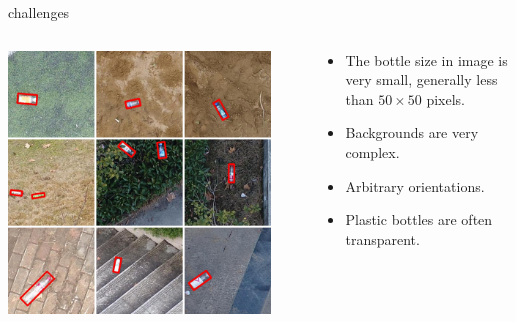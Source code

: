 \documentclass[newPxFont, fullfooter, sectionpages, progressbar, displaynote]{beamer}
\begin{document}
\begin{frame}[c]{challenges}
	\only<3->
	{
		\begin{columns}
			\begin{column}{0.4\linewidth}
				\centering
				\includegraphics[width=0.9\textwidth]{images/bottle_UAV.png}
			\end{column}
	
			\begin{column}{0.6\linewidth}
				\begin{itemize}
					\item<3-> \footnotesize{The bottle size in image is very small, generally less than $50\times 50$ pixels.}
					\item<4-> \footnotesize{Backgrounds are very complex.}
					\item<5-> \footnotesize{Arbitrary orientations.}
					\item<6-> \footnotesize{Plastic bottles are often transparent.}
				\end{itemize}
			\end{column}
		\end{columns}
		\vspace{1cm}
	}
	
	


\end{frame}
\end{document}
